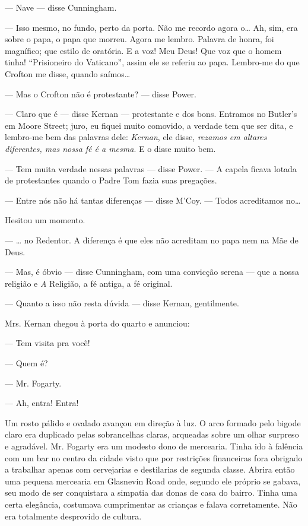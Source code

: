 --- Nave --- disse Cunningham.

--- Isso mesmo, no fundo, perto da porta. Não me recordo agora o\ldots{}
Ah, sim, era sobre o papa, o papa que morreu. Agora me lembro. Palavra
de honra, foi magnífico; que estilo de oratória. E a voz! Meu Deus!
Que voz que o homem tinha! ``Prisioneiro do Vaticano'', assim ele
se referiu ao papa. Lembro-me do que Crofton me disse, quando
saímos\ldots{}

--- Mas o Crofton não é protestante? --- disse Power.

--- Claro que é --- disse Kernan --- protestante e dos bons. Entramos
no Butler's em Moore Street; juro, eu fiquei muito comovido, a
verdade tem que ser dita, e lembro-me bem das palavras dele:
\textit{Kernan}, ele disse, \textit{rezamos em altares diferentes, mas
nossa fé é a mesma}. E o disse muito bem.

--- Tem muita verdade nessas palavras --- disse Power. --- A capela
ficava lotada de protestantes quando o Padre Tom fazia suas pregações.

--- Entre nós não há tantas diferenças --- disse M'Coy. --- Todos
acreditamos no\ldots{}

Hesitou um momento.

--- \ldots{} no Redentor. A diferença é que eles não acreditam no papa nem na Mãe
de Deus.

--- Mas, é óbvio --- disse Cunningham, com uma convicção serena --- que
a nossa religião e \textit{A} Religião, a fé antiga, a fé original.

--- Quanto a isso não resta dúvida --- disse Kernan, gentilmente.

Mrs. Kernan chegou à porta do quarto e anunciou:

--- Tem visita pra você!

--- Quem é?

--- Mr. Fogarty.

--- Ah, entra! Entra!

Um rosto pálido e ovalado avançou em direção à luz. O arco formado
pelo bigode claro era duplicado pelas sobrancelhas claras, arqueadas
sobre um olhar surpreso e agradável. Mr. Fogarty era um modesto dono
de mercearia. Tinha ido à falência com um bar no centro da cidade
visto que por restrições financeiras fora obrigado a trabalhar apenas
com cervejarias e destilarias de segunda classe. Abrira então uma
pequena mercearia em Glasnevin Road onde, segundo ele próprio se
gabava, seu modo de ser conquistara a simpatia das donas de casa do
bairro. Tinha uma certa elegância, costumava cumprimentar as crianças
e falava corretamente. Não era totalmente desprovido de cultura.

